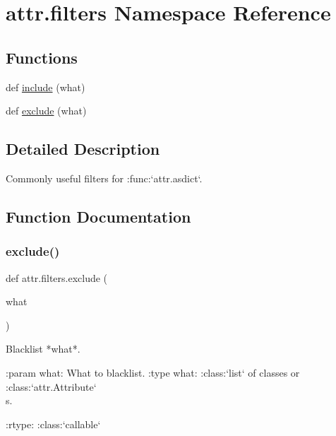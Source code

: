 \hypertarget{namespaceattr_1_1filters}{}\section{attr.\+filters Namespace Reference}
\label{namespaceattr_1_1filters}
\subsection*{Functions}
\begin{DoxyCompactItemize}
\item 
def \hyperlink{namespaceattr_1_1filters_a7a5b29aa035bff272b0da3974d12fa9f}{include} (what)
\item 
def \hyperlink{namespaceattr_1_1filters_aa29ccc775c8e224f455682a080465aa1}{exclude} (what)
\end{DoxyCompactItemize}


\subsection{Detailed Description}
\begin{DoxyVerb}Commonly useful filters for :func:`attr.asdict`.
\end{DoxyVerb}
 

\subsection{Function Documentation}
\mbox{\label{namespaceattr_1_1filters_aa29ccc775c8e224f455682a080465aa1}} 
\subsubsection{\texorpdfstring{exclude()}{exclude()}}
{\footnotesize\ttfamily def attr.\+filters.\+exclude (\begin{DoxyParamCaption}\item[{}]{what }\end{DoxyParamCaption})}

\begin{DoxyVerb}Blacklist *what*.

:param what: What to blacklist.
:type what: :class:`list` of classes or :class:`attr.Attribute`\\ s.

:rtype: :class:`callable`
\end{DoxyVerb}
 \mbox{\label{namespaceattr_1_1filters_a7a5b29aa035bff272b0da3974d12fa9f}} 
